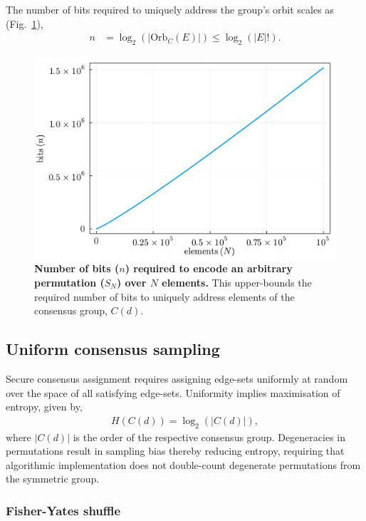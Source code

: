 The number of bits required to uniquely address the group's orbit scales as (Fig.~\ref{fig:bits_permutations}),
\begin{align}
	n & = \log_2(|\mathrm{Orb}_C(E)|) \leq \log_2(|E|!).
\end{align}

\begin{figure}[!htb]
	\includegraphics[width=\columnwidth]{figures/bits_permutations.pdf}
	\caption{\textbf{Number of bits ($n$) required to encode an arbitrary permutation ($S_N$) over $N$ elements.} This upper-bounds the required number of bits to uniquely address elements of the consensus group, $C(d)$.} \label{fig:bits_permutations}
\end{figure}

\subsection{Uniform consensus sampling} \label{sec:uniform_consensus_samp}

Secure consensus assignment requires assigning edge-sets uniformly at random over the space of all satisfying edge-sets. Uniformity implies maximisation of entropy, given by,
\begin{align}
	H(C(d)) = \log_2(|C(d)|),
\end{align}
where $|C(d)|$ is the order of the respective consensus group. Degeneracies in permutations result in sampling bias thereby reducing entropy, requiring that algorithmic implementation does not double-count degenerate permutations from the symmetric group.

\subsubsection{Fisher-Yates shuffle}


